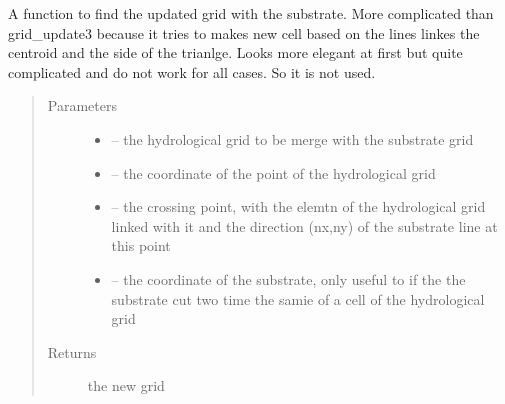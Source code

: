 \documentclass[letterpaper,10pt,english]{sphinxmanual}
\begin{document}
\begin{fulllineitems}
\label{\detokenize{index:src.substrate.grid_update_sub2}}
A function to find the updated grid with the substrate. More complicated than grid\_update3 because it tries to makes
new cell based on the lines linkes the centroid and the side of the trianlge. Looks more elegant at first but
quite complicated and do not work for all cases. So it is not used.
\begin{quote}\begin{description}
\item[{Parameters}] \leavevmode\begin{itemize}
\item {} 
 -- the hydrological grid to be merge with the substrate grid

\item {} 
 -- the coordinate of the point of the hydrological grid

\item {} 
 -- the crossing point, with the elemtn of the hydrological grid linked with it and the
direction (nx,ny) of the substrate line at this point

\item {} 
 -- the coordinate of the substrate, only useful to if the the substrate cut two time the samie of a
cell of the hydrological grid

\end{itemize}

\item[{Returns}] \leavevmode
the new grid

\end{description}\end{quote}

\end{fulllineitems}

\end{document}
